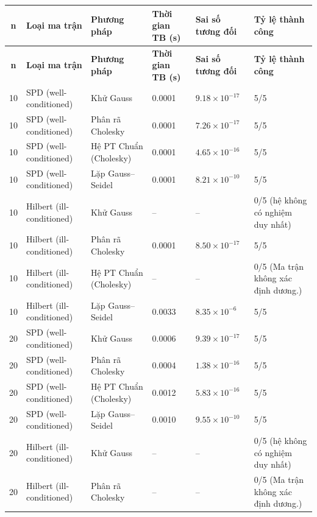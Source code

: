 \documentclass[a4paper]{article}
\begin{document}
\begingroup
\scriptsize
\setlength{\tabcolsep}{4pt}
\renewcommand{\arraystretch}{1.15}
\begin{longtable}{|c|p{}|p{}|p{}|p{}|p{}|}
\hline
\textbf{n} & \textbf{Loại ma trận} & \textbf{Phương pháp} & \textbf{Thời gian TB (s)} & \textbf{Sai số tương đối} & \textbf{Tỷ lệ thành công} \\ \hline
\endfirsthead
\hline
\textbf{n} & \textbf{Loại ma trận} & \textbf{Phương pháp} & \textbf{Thời gian TB (s)} & \textbf{Sai số tương đối} & \textbf{Tỷ lệ thành công} \\ \hline
\endhead
10 & SPD (well-conditioned) & Khử Gauss & 0.0001 & $9.18\times 10^{-17}$ & 5/5 \\ \hline
10 & SPD (well-conditioned) & Phân rã Cholesky & 0.0001 & $7.26\times 10^{-17}$ & 5/5 \\ \hline
10 & SPD (well-conditioned) & Hệ PT Chuẩn (Cholesky) & 0.0001 & $4.65\times 10^{-16}$ & 5/5 \\ \hline
10 & SPD (well-conditioned) & Lặp Gauss--Seidel & 0.0001 & $8.21\times 10^{-10}$ & 5/5 \\ \hline
10 & Hilbert (ill-conditioned) & Khử Gauss & -- & -- & 0/5 (hệ không có nghiệm duy nhất) \\ \hline
10 & Hilbert (ill-conditioned) & Phân rã Cholesky & 0.0001 & $8.50\times 10^{-17}$ & 5/5 \\ \hline
10 & Hilbert (ill-conditioned) & Hệ PT Chuẩn (Cholesky) & -- & -- & 0/5 (Ma trận không xác định dương.) \\ \hline
10 & Hilbert (ill-conditioned) & Lặp Gauss--Seidel & 0.0033 & $8.35\times 10^{-6}$ & 5/5 \\ \hline
20 & SPD (well-conditioned) & Khử Gauss & 0.0006 & $9.39\times 10^{-17}$ & 5/5 \\ \hline
20 & SPD (well-conditioned) & Phân rã Cholesky & 0.0004 & $1.38\times 10^{-16}$ & 5/5 \\ \hline
20 & SPD (well-conditioned) & Hệ PT Chuẩn (Cholesky) & 0.0012 & $5.83\times 10^{-16}$ & 5/5 \\ \hline
20 & SPD (well-conditioned) & Lặp Gauss--Seidel & 0.0010 & $9.55\times 10^{-10}$ & 5/5 \\ \hline
20 & Hilbert (ill-conditioned) & Khử Gauss & -- & -- & 0/5 (hệ không có nghiệm duy nhất) \\ \hline
20 & Hilbert (ill-conditioned) & Phân rã Cholesky & -- & -- & 0/5 (Ma trận không xác định dương.) \\ \hline

\end{longtable}
\end{document}

